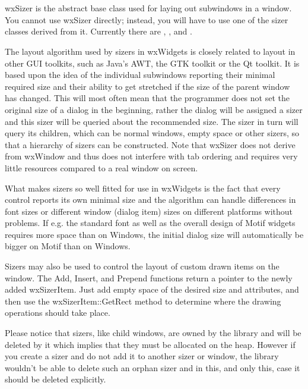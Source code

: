 \section{}\label{wxsizer}

wxSizer is the abstract base class used for laying out subwindows in a window. You
cannot use wxSizer directly; instead, you will have to use one of the sizer
classes derived from it. Currently there are , 
,
 and .

The layout algorithm used by sizers in wxWidgets is closely related to layout
in other GUI toolkits, such as Java's AWT, the GTK toolkit or the Qt toolkit. It is
based upon the idea of the individual subwindows reporting their minimal required
size and their ability to get stretched if the size of the parent window has changed.
This will most often mean that the programmer does not set the original size of
a dialog in the beginning, rather the dialog will be assigned a sizer and this sizer
will be queried about the recommended size. The sizer in turn will query its
children, which can be normal windows, empty space or other sizers, so that
a hierarchy of sizers can be constructed. Note that wxSizer does not derive from wxWindow
and thus does not interfere with tab ordering and requires very little resources compared
to a real window on screen.

What makes sizers so well fitted for use in wxWidgets is the fact that every control
reports its own minimal size and the algorithm can handle differences in font sizes
or different window (dialog item) sizes on different platforms without problems. If e.g.
the standard font as well as the overall design of Motif widgets requires more space than
on Windows, the initial dialog size will automatically be bigger on Motif than on Windows.

Sizers may also be used to control the layout of custom drawn items on the window.  The
Add, Insert, and Prepend functions return a pointer to the newly added wxSizerItem. Just
add empty space of the desired size and attributes, and then use the wxSizerItem::GetRect
method to determine where the drawing operations should take place.


Please notice that sizers, like child windows, are owned by the library and
will be deleted by it which implies that they must be allocated on the heap.
However if you create a sizer and do not add it to another sizer or window, the
library wouldn't be able to delete such an orphan sizer and in this, and only
this, case it should be deleted explicitly.

